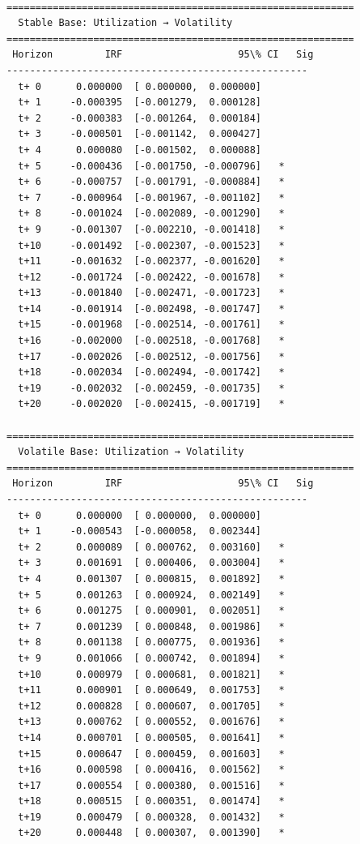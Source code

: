 \documentclass[11pt]{article}
\begin{document}
    \begin{Verbatim}[commandchars=\\\{\}]

============================================================
  Stable Base: Utilization → Volatility
============================================================
 Horizon         IRF                    95\% CI   Sig
----------------------------------------------------
  t+ 0      0.000000  [ 0.000000,  0.000000]
  t+ 1     -0.000395  [-0.001279,  0.000128]
  t+ 2     -0.000383  [-0.001264,  0.000184]
  t+ 3     -0.000501  [-0.001142,  0.000427]
  t+ 4      0.000080  [-0.001502,  0.000088]
  t+ 5     -0.000436  [-0.001750, -0.000796]   *
  t+ 6     -0.000757  [-0.001791, -0.000884]   *
  t+ 7     -0.000964  [-0.001967, -0.001102]   *
  t+ 8     -0.001024  [-0.002089, -0.001290]   *
  t+ 9     -0.001307  [-0.002210, -0.001418]   *
  t+10     -0.001492  [-0.002307, -0.001523]   *
  t+11     -0.001632  [-0.002377, -0.001620]   *
  t+12     -0.001724  [-0.002422, -0.001678]   *
  t+13     -0.001840  [-0.002471, -0.001723]   *
  t+14     -0.001914  [-0.002498, -0.001747]   *
  t+15     -0.001968  [-0.002514, -0.001761]   *
  t+16     -0.002000  [-0.002518, -0.001768]   *
  t+17     -0.002026  [-0.002512, -0.001756]   *
  t+18     -0.002034  [-0.002494, -0.001742]   *
  t+19     -0.002032  [-0.002459, -0.001735]   *
  t+20     -0.002020  [-0.002415, -0.001719]   *

============================================================
  Volatile Base: Utilization → Volatility
============================================================
 Horizon         IRF                    95\% CI   Sig
----------------------------------------------------
  t+ 0      0.000000  [ 0.000000,  0.000000]
  t+ 1     -0.000543  [-0.000058,  0.002344]
  t+ 2      0.000089  [ 0.000762,  0.003160]   *
  t+ 3      0.001691  [ 0.000406,  0.003004]   *
  t+ 4      0.001307  [ 0.000815,  0.001892]   *
  t+ 5      0.001263  [ 0.000924,  0.002149]   *
  t+ 6      0.001275  [ 0.000901,  0.002051]   *
  t+ 7      0.001239  [ 0.000848,  0.001986]   *
  t+ 8      0.001138  [ 0.000775,  0.001936]   *
  t+ 9      0.001066  [ 0.000742,  0.001894]   *
  t+10      0.000979  [ 0.000681,  0.001821]   *
  t+11      0.000901  [ 0.000649,  0.001753]   *
  t+12      0.000828  [ 0.000607,  0.001705]   *
  t+13      0.000762  [ 0.000552,  0.001676]   *
  t+14      0.000701  [ 0.000505,  0.001641]   *
  t+15      0.000647  [ 0.000459,  0.001603]   *
  t+16      0.000598  [ 0.000416,  0.001562]   *
  t+17      0.000554  [ 0.000380,  0.001516]   *
  t+18      0.000515  [ 0.000351,  0.001474]   *
  t+19      0.000479  [ 0.000328,  0.001432]   *
  t+20      0.000448  [ 0.000307,  0.001390]   *
    \end{Verbatim}
\end{document}
